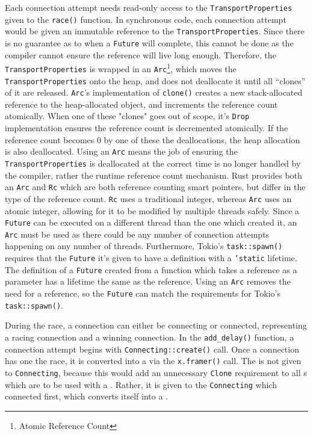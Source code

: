 Each connection attempt needs read-only access to the \texttt{TransportProperties} given to the \texttt{race()}
function.
In synchronous code, each connection attempt would be given an immutable reference to the \texttt{TransportProperties}.
Since there is no guarantee as to when a \texttt{Future} will complete, this cannot be done as the compiler cannot
ensure the reference will live long enough.
Therefore, the \texttt{TransportProperties} is wrapped in an \texttt{Arc}\footnote{Atomic Reference Count}, which moves
the \texttt{TransportProperties} onto the heap, and does not deallocate it until all “clones” of it are released.
\texttt{Arc}'s implementation of \texttt{clone()} creates a new stack-allocated reference to the heap-allocated object,
and increments the reference count atomically.
When one of these "clones" goes out of scope, it's \texttt{Drop} implementation ensures the reference count is
decremented atomically.
If the reference count becomes \(0\) by one of these the deallocations, the heap allocation is also deallocated.
Using an \texttt{Arc} means the job of ensuring the \texttt{TransportProperties} is deallocated at the correct time is
no longer handled by the compiler, rather the runtime reference count mechanism.
Rust provides both an \texttt{Arc} and \texttt{Rc} which are both reference counting smart pointers, but differ in the
type of the reference count.
\texttt{Rc} uses a traditional integer, whereas \texttt{Arc} uses an atomic integer, allowing for it to be modified
by multiple threads safely.
Since a \texttt{Future} can be executed on a different thread than the one which created it, an \texttt{Arc} must be
used as there could be any number of connection attempts happening on any number of threads.
Furthermore, Tokio's \texttt{task::spawn()} requires that the \texttt{Future} it's given to have a definition with a
\texttt{'static} lifetime.
The definition of a \texttt{Future} created from a function which takes a reference as a parameter has a lifetime the
same as the reference.
Using an \texttt{Arc} removes the need for a reference, so the \texttt{Future} can match the requirements for Tokio's
\texttt{task::spawn()}.

During the race, a connection can either be connecting or connected, representing a racing connection and a winning
connection.
In the \texttt{add\_delay()} function, a connection attempt begins with \texttt{Connecting::create()} call.
Once a connection has one the race, it is converted into a \connection{} via the \texttt{x.framer()} call.
The \framer{} is not given to \texttt{Connecting}, because this would add an unnecessary \texttt{Clone} requirement to
all \framer{}s which are to be used with a \connection{}.
Rather, it is given to the \texttt{Connecting} which connected first, which converts itself into a \connection{}.

